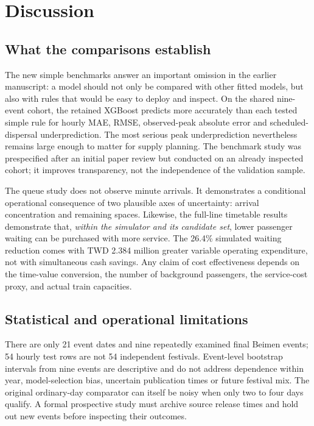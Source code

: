 \section{Discussion}
\subsection{What the comparisons establish}
The new simple benchmarks answer an important omission in the earlier manuscript: a model should not only be compared with other fitted models, but also with rules that would be easy to deploy and inspect. On the shared nine-event cohort, the retained XGBoost predicts more accurately than each tested simple rule for hourly MAE, RMSE, observed-peak absolute error and scheduled-dispersal underprediction. The most serious peak underprediction nevertheless remains large enough to matter for supply planning. The benchmark study was prespecified after an initial paper review but conducted on an already inspected cohort; it improves transparency, not the independence of the validation sample.

The queue study does not observe minute arrivals. It demonstrates a conditional operational consequence of two plausible axes of uncertainty: arrival concentration and remaining spaces. Likewise, the full-line timetable results demonstrate that, \emph{within the simulator and its candidate set}, lower passenger waiting can be purchased with more service. The 26.4\% simulated waiting reduction comes with TWD 2.384 million greater variable operating expenditure, not with simultaneous cash savings. Any claim of cost effectiveness depends on the time-value conversion, the number of background passengers, the service-cost proxy, and actual train capacities.

\subsection{Statistical and operational limitations}
There are only 21 event dates and nine repeatedly examined final Beimen events; 54 hourly test rows are not 54 independent festivals. Event-level bootstrap intervals from nine events are descriptive and do not address dependence within year, model-selection bias, uncertain publication times or future festival mix. The original ordinary-day comparator can itself be noisy when only two to four days qualify. A formal prospective study must archive source release times and hold out new events before inspecting their outcomes.

